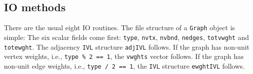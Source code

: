 \subsection{IO methods}
\label{subsection:Graph:proto:IO}
\par
There are the usual eight IO routines.
The file structure of a {\tt Graph} object is simple:
The six scalar fields come first:
{\tt type},
{\tt nvtx},
{\tt nvbnd},
{\tt nedges},
{\tt totvwght} and
{\tt totewght}.
The adjacency {\tt IVL} structure {\tt adjIVL} follows.
If the graph has non-unit vertex weights, i.e., {\tt type \% 2 == 1}, 
the {\tt vwghts} vector follows.
If the graph has non-unit edge weights, i.e., {\tt type / 2 == 1}, 
the {\tt IVL} structure {\tt ewghtIVL} follows.
\par

